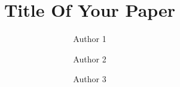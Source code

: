 \documentclass[12pt,onecolumn,letterpaper]{article}
\begin{document}
\title{Title Of Your Paper}

\author[1]{Author 1}
\author[2]{Author 2}
\author[1]{Author 3}

\date{}

\maketitle







\begin{singlespace}


\end{singlespace}

%
\end{document}
